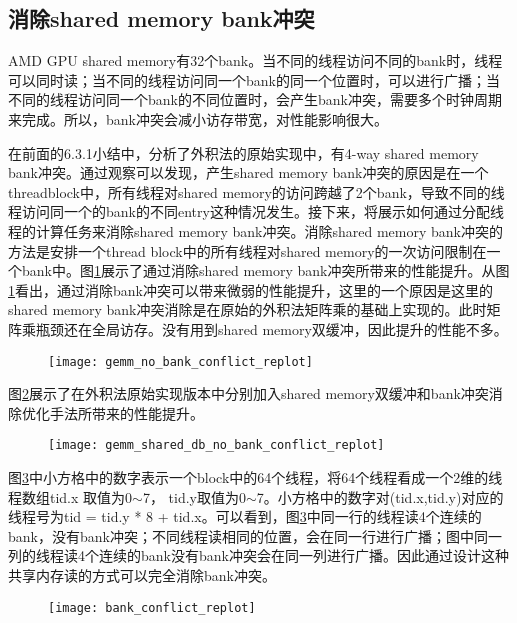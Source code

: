 \subsection{消除shared memory bank冲突}
AMD GPU shared memory有32个bank。当不同的线程访问不同的bank时，线程可以同时读；当不同的线程访问同一个bank的同一个位置时，可以进行广播；当不同的线程访问同一个bank的不同位置时，会产生bank冲突，需要多个时钟周期来完成。所以，bank冲突会减小访存带宽，对性能影响很大。

在前面的6.3.1小结中，分析了外积法的原始实现中，有4-way shared memory bank冲突。通过观察可以发现，产生shared memory bank冲突的原因是在一个threadblock中，所有线程对shared memory的访问跨越了2个bank，导致不同的线程访问同一个的bank的不同entry这种情况发生。接下来，将展示如何通过分配线程的计算任务来消除shared memory bank冲突。消除shared memory bank冲突的方法是安排一个thread block中的所有线程对shared memory的一次访问限制在一个bank中。图\ref{fig:gemm_no_bank_conflict_replot}展示了通过消除shared memory bank冲突所带来的性能提升。从图\ref{fig:gemm_no_bank_conflict_replot}看出，通过消除bank冲突可以带来微弱的性能提升，这里的一个原因是这里的shared memory bank冲突消除是在原始的外积法矩阵乘的基础上实现的。此时矩阵乘瓶颈还在全局访存。没有用到shared memory双缓冲，因此提升的性能不多。

\begin{figure}[htbp]
	\centering
	\texttt{[image: gemm\_no\_bank\_conflict\_replot]}
	\label{fig:gemm_no_bank_conflict_replot}
\end{figure}


图\ref{fig:gemm_shared_db_no_bank_conflict_replot}展示了在外积法原始实现版本中分别加入shared memory双缓冲和bank冲突消除优化手法所带来的性能提升。
\begin{figure}[htbp]
	\centering
	\texttt{[image: gemm\_shared\_db\_no\_bank\_conflict\_replot]}
	\label{fig:gemm_shared_db_no_bank_conflict_replot}
\end{figure}
图\ref{fig:bank_conflict_replot}中小方格中的数字表示一个block中的64个线程，将64个线程看成一个2维的线程数组tid.x 取值为0$\sim$7， tid.y取值为0$\sim$7。小方格中的数字对(tid.x,tid.y)对应的线程号为tid = tid.y * 8 + tid.x。可以看到，图\ref{fig:bank_conflict_replot}中同一行的线程读4个连续的bank，没有bank冲突；不同线程读相同的位置，会在同一行进行广播；图中同一列的线程读4个连续的bank没有bank冲突会在同一列进行广播。因此通过设计这种共享内存读的方式可以完全消除bank冲突。
\begin{figure}[htbp]
	\centering
	\texttt{[image: bank\_conflict\_replot]}
	\label{fig:bank_conflict_replot}
\end{figure}


